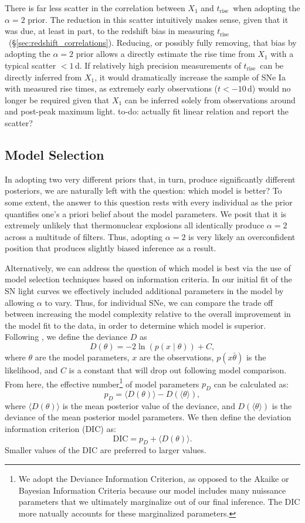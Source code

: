 \documentclass[twocolumn]{./aastex63}
\newcommand{\todo}[1]{{\color{magenta} to-do: {#1}}}
\newcommand{\trise}{$t_\mathrm{rise}$}
\begin{document}
There is far less scatter in the correlation between $X_1$ and \trise\ when
adopting the $\alpha = 2$ prior. The reduction in this scatter intuitively
makes sense, given that it was due, at least in part, to the redshift bias in
measuring \trise\ (\S\ref{sec:redshift_correlations}). Reducing, or possibly
fully removing, that bias by adopting the $\alpha = 2$ prior allows a directly
estimate the rise time from $X_1$ with a typical scatter $< 1$\,d. If
relatively high precision measurements of \trise\ can be directly inferred
from $X_1$, it would dramatically increase the sample of SNe Ia with measured
rise times, as extremely early observations ($t < -10$\,d) would no longer be
required given that $X_1$ can be inferred solely from observations around and
post-peak maximum light. \todo{actually fit linear relation and report the
scatter?}

\subsection{Model Selection}\label{sec:dic}

In adopting two very different priors that, in turn, produce significantly
different posteriors, we are naturally left with the question: which model is
better? To some extent, the answer to this question rests with every individual
as the prior quantifies one's a priori belief about the model parameters. We
posit that it is extremely unlikely that thermonuclear explosions all
identically produce $\alpha = 2$ across a multitude of filters. Thus, adopting
$\alpha = 2$ is very likely an overconfident position that produces slightly
biased inference as a result.

Alternatively, we can address the question of which model is best via the use
of model selection techniques based on information criteria. In our initial
fit of the SN light curves we effectively included additional parameters in
the model by allowing $\alpha$ to vary. Thus, for individual SNe, we can
compare the trade off between increasing the model complexity relative to the
overall improvement in the model fit to the data, in order to determine which
model is superior. Following \citet{Spiegelhalter02}, we define the deviance
$D$ as
%
$$D(\theta) = -2 \ln (p(x\mid \theta)) + C,$$
%
where $\theta$ are the model parameters, $x$ are the observations, $p(x\bar
\theta)$ is the likelihood, and $C$ is a constant that will drop out following
model comparison. From here, the effective number\footnote{We adopt the
Deviance Information Criterion, as opposed to the Akaike or Bayesian
Information Criteria because our model includes many nuissance parameters that
we ultimately marginalize out of our final inference. The DIC more natually
accounts for these marginalized parameters.} of model parameters $p_D$ can be
calculated as:
%
$$p_D = \langle D(\theta) \rangle - D(\langle \theta \rangle),$$
%
where $\langle D(\theta) \rangle$ is the mean posterior value of the deviance,
and $D(\langle \theta \rangle)$ is the deviance of the mean posterior model
parameters. We then define the deviation information criterion (DIC) as:
%
$$\mathrm{DIC} = p_D + \langle D(\theta) \rangle.$$
Smaller values of  the DIC are  preferred to larger values.
\end{document}
